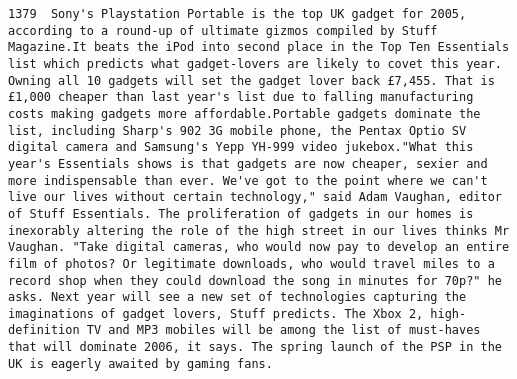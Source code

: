 \documentclass[11pt]{article}
\begin{document}
\begin{Verbatim}[commandchars=\\\{\}]
         1379  Sony's Playstation Portable is the top UK gadget for 2005, according to a round-up of ultimate gizmos compiled by Stuff Magazine.It beats the iPod into second place in the Top Ten Essentials list which predicts what gadget-lovers are likely to covet this year. Owning all 10 gadgets will set the gadget lover back £7,455. That is £1,000 cheaper than last year's list due to falling manufacturing costs making gadgets more affordable.Portable gadgets dominate the list, including Sharp's 902 3G mobile phone, the Pentax Optio SV digital camera and Samsung's Yepp YH-999 video jukebox."What this year's Essentials shows is that gadgets are now cheaper, sexier and more indispensable than ever. We've got to the point where we can't live our lives without certain technology," said Adam Vaughan, editor of Stuff Essentials. The proliferation of gadgets in our homes is inexorably altering the role of the high street in our lives thinks Mr Vaughan. "Take digital cameras, who would now pay to develop an entire film of photos? Or legitimate downloads, who would travel miles to a record shop when they could download the song in minutes for 70p?" he asks. Next year will see a new set of technologies capturing the imaginations of gadget lovers, Stuff predicts. The Xbox 2, high-definition TV and MP3 mobiles will be among the list of must-haves that will dominate 2006, it says. The spring launch of the PSP in the UK is eagerly awaited by gaming fans.                                                                                                                                                                                                                                                                                                                                                                                                                                                                                                                                                                                                                                                                                                                                                                                                                                                                                                                                                                                                                                                                                                                                                                                                                                                                                                                                                                                                                                                                                                                                                                                                                                                                                                                                                                                                                                                                                                         
\end{Verbatim}
\end{document}
